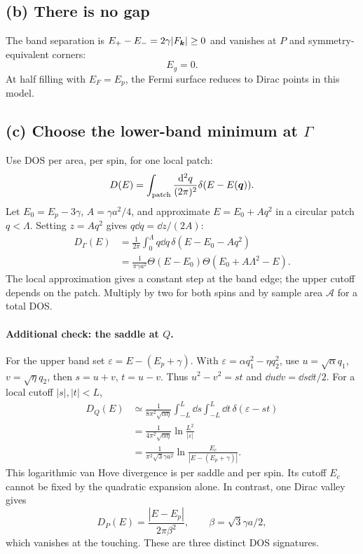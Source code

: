\subsection*{(b) There is no gap}
The band separation is $E_+-E_-=2\gamma|F_{\boldsymbol{k}}|\geq0$ and vanishes at $P$ and symmetry-equivalent corners:
\[
\boxed{E_g=0.}
\]
At half filling with $E_F=E_p$, the Fermi surface reduces to Dirac points in this model.

\subsection*{(c) Choose the lower-band minimum at $\Gamma$}
Use DOS per area, per spin, for one local patch:
\[
D(E)=\int_{\rm patch}\frac{\mathop{}\!\mathrm{d}^2q}{(2\pi)^2}\delta(E-E(\boldsymbol{q})).
\]
Let $E_0=E_p-3\gamma$, $A=\gamma a^2/4$, and approximate $E=E_0+Aq^2$ in a circular patch $q<\Lambda$. Setting $z=Aq^2$ gives $q\dd q=\dd z/(2A)$:
\begin{align*}
D_\Gamma(E)&=\frac1{2\pi}\int_0^\Lambda q\dd q\,\delta(E-E_0-Aq^2)\\
&=\boxed{\frac1{\pi\gamma a^2}
\Theta(E-E_0)\Theta(E_0+A\Lambda^2-E).}
\end{align*}
The local approximation gives a constant step at the band edge; the upper cutoff depends on the patch. Multiply by two for both spins and by sample area $\mathcal A$ for a total DOS.

\paragraph{Additional check: the saddle at $Q$.}
For the upper band set $\varepsilon=E-(E_p+\gamma)$. With $\varepsilon=\alpha q_1^2-\eta q_2^2$, use $u=\sqrt\alpha q_1$, $v=\sqrt\eta q_2$, then $s=u+v$, $t=u-v$. Thus $u^2-v^2=st$ and $\dd u\dd v=\dd s\dd t/2$. For a local cutoff $|s|,|t|<L$,
\begin{align*}
D_Q(E)&\simeq\frac1{8\pi^2\sqrt{\alpha\eta}}
\int_{-L}^L\dd s\int_{-L}^L\dd t\,\delta(\varepsilon-st)\\
&=\frac1{4\pi^2\sqrt{\alpha\eta}}\ln\frac{L^2}{|\varepsilon|}\\
&=\frac1{\pi^2\sqrt3\gamma a^2}
\ln\frac{E_c}{|E-(E_p+\gamma)|}.
\end{align*}
This logarithmic van Hove divergence is per saddle and per spin. Its cutoff $E_c$ cannot be fixed by the quadratic expansion alone. In contrast, one Dirac valley gives
\[
D_P(E)=\frac{|E-E_p|}{2\pi\beta^2},\qquad\beta=\sqrt3\gamma a/2,
\]
which vanishes at the touching. These are three distinct DOS signatures.


